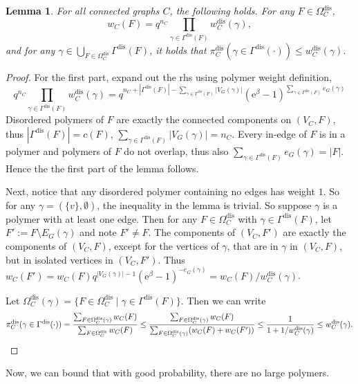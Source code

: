 \documentclass[11pt]{article}
\theoremstyle{plain}
\newtheorem{lemma}[theorem]{Lemma}
\newcommand{\emm}{\mathrm{e}}
\newcommand{\1}{\mathbb{1}}
\newcommand{\dis}{\mathrm{dis}}
\begin{document}
\begin{lemma}
    For all connected graphs \(C\), the following holds. For any \(F\in\Omega^\dis_C\),
    \[
w_C(F)=q^{n_C}\prod_{\gamma\in\Gamma^\dis(F)} w^\dis_C(\gamma),
    \]and for any \(\gamma\in\bigcup_{F\in\Omega_C^\dis}\Gamma^\dis(F)\), it holds that $\pi^\dis_C(\gamma\in\Gamma^\dis(\cdot))\leq w^\dis_C(\gamma).$
\end{lemma}
\begin{proof}
    For the first part, expand out the rhs using polymer weight definition, 
    \[
    q^{n_C}\prod_{\gamma\in\Gamma^\dis(F)} w^\dis_C(\gamma) = q^{n_C+|\Gamma^\dis(F)| - \sum_{\gamma\in\Gamma^\dis(F)} |V_G(\gamma)|} (\emm^\beta-1)^{\sum_{\gamma\in\Gamma^\dis(F)}  e_G(\gamma)}
    \]
    Disordered polymers of \(F\) are exactly the connected components on \((V_C,F)\), thus \(|\Gamma^\dis(F)| = c(F)\), \(\sum_{\gamma\in\Gamma^\dis(F)} |V_G(\gamma)| = n_C\). Every in-edge of \(F\) is in a polymer and polymers of \(F\) do not overlap, thus also \(\sum_{\gamma\in\Gamma^\dis(F)} e_G(\gamma) = |F|\). Hence the the first part of the lemma follows.

    Next, notice that any disordered polymer containing no edges has weight \(1\). So for any \(\gamma = (\{v\}, \emptyset)\), the inequality in the lemma is trivial. So suppose \(\gamma\) is a polymer with at least one edge. Then for any \(F\in\Omega^\dis_C\) with \(\gamma\in\Gamma^\dis(F)\), let \(F' := F\setminus E_G(\gamma)\) and note \(F'\neq F\). The components of \((V_C, F')\) are exactly the components of \((V_C, F)\), except for the vertices of \(\gamma\), that are in \(\gamma\) in \((V_C,F)\), but in isolated vertices in \((V_C,F')\). Thus \(w_C(F') = w_C(F) q^{|V_G(\gamma)| - 1} (\emm^\beta-1)^{-e_G(\gamma)} = w_C(F) / w^\dis_C(\gamma)\).

    Let $\Omega^\dis_C(\gamma)=\big\{F\in\Omega^\dis_C\mid  \gamma\in\Gamma^\dis(F)\big\}$. Then we can  write 
    \[
    \pi^\dis_C(\gamma\in\Gamma^\dis(\cdot)) = \frac{\sum_{F\in\Omega^\dis_C(\gamma)} w_C(F)}{\sum_{F\in\Omega^\dis_C} w_C(F)} \leq \frac{\sum_{F\in\Omega^\dis_C(\gamma)} w_C(F)}{\sum_{F\in\Omega^\dis_C(\gamma)} (w_C(F) + w_C(F'))} \leq \frac{1}{1+1/w^\dis_C(\gamma)}\leq w^\dis_C(\gamma).\qedhere
    \]
\end{proof}

Now, we can bound that with good probability, there are no large polymers.
\end{document}
